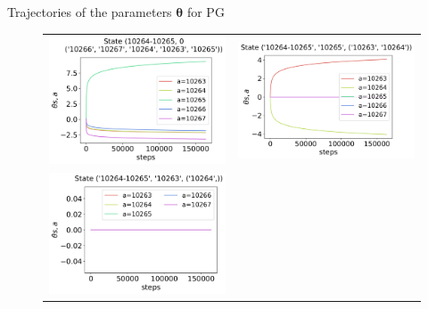 \documentclass[10pt, aspectratio=169, compress, protectframetitle, handout]{beamer}
\begin{document}
\begin{frame}{Trajectories of the parameters $\boldsymbol \theta$ for PG}
    
    \begin{figure}
        \centering
        \begin{tabular}{cc}
            \includegraphics[scale=0.34,valign=b]{figures/theta_PG_state_0.png} &
            \includegraphics[scale=0.34,valign=b]{figures/theta_PG_state_1.png} \\
            \hspace*{-10pt}\includegraphics[scale=0.34,valign=b]{figures/theta_PG_state_2.png} &

\end{tabular}
\end{figure}
\end{frame}
\end{document}
